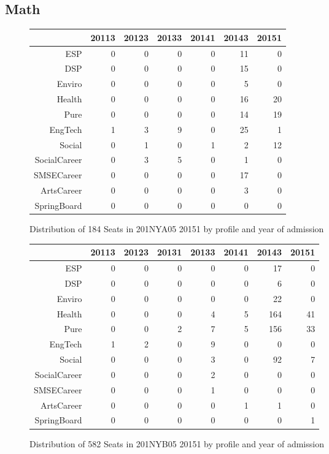 \documentclass{article}\usepackage[]{graphicx}\usepackage[]{color}
\begin{document}
\subsection{Math}
\begin{figure}[H]
\centering
\begin{tabular}{rrrrrrr}
  \hline
 & 20113 & 20123 & 20133 & 20141 & 20143 & 20151 \\ 
  \hline
ESP &   0 &   0 &   0 &   0 &  11 &   0 \\ 
  DSP &   0 &   0 &   0 &   0 &  15 &   0 \\ 
  Enviro &   0 &   0 &   0 &   0 &   5 &   0 \\ 
  Health &   0 &   0 &   0 &   0 &  16 &  20 \\ 
  Pure &   0 &   0 &   0 &   0 &  14 &  19 \\ 
  EngTech &   1 &   3 &   9 &   0 &  25 &   1 \\ 
  Social &   0 &   1 &   0 &   1 &   2 &  12 \\ 
  SocialCareer &   0 &   3 &   5 &   0 &   1 &   0 \\ 
  SMSECareer &   0 &   0 &   0 &   0 &  17 &   0 \\ 
  ArtsCareer &   0 &   0 &   0 &   0 &   3 &   0 \\ 
  SpringBoard &   0 &   0 &   0 &   0 &   0 &   0 \\ 
   \hline
\end{tabular}
\caption{Distribution of 184 Seats in 201NYA05 20151 by profile and year of admission} 
\end{figure}
\begin{figure}[H]
\centering
\begin{tabular}{rrrrrrrr}
  \hline
 & 20113 & 20123 & 20131 & 20133 & 20141 & 20143 & 20151 \\ 
  \hline
ESP &   0 &   0 &   0 &   0 &   0 &  17 &   0 \\ 
  DSP &   0 &   0 &   0 &   0 &   0 &   6 &   0 \\ 
  Enviro &   0 &   0 &   0 &   0 &   0 &  22 &   0 \\ 
  Health &   0 &   0 &   0 &   4 &   5 & 164 &  41 \\ 
  Pure &   0 &   0 &   2 &   7 &   5 & 156 &  33 \\ 
  EngTech &   1 &   2 &   0 &   9 &   0 &   0 &   0 \\ 
  Social &   0 &   0 &   0 &   3 &   0 &  92 &   7 \\ 
  SocialCareer &   0 &   0 &   0 &   2 &   0 &   0 &   0 \\ 
  SMSECareer &   0 &   0 &   0 &   1 &   0 &   0 &   0 \\ 
  ArtsCareer &   0 &   0 &   0 &   0 &   1 &   1 &   0 \\ 
  SpringBoard &   0 &   0 &   0 &   0 &   0 &   0 &   1 \\ 
   \hline
\end{tabular}
\caption{Distribution of 582 Seats in 201NYB05 20151 by profile and year of admission} 
\end{figure}
\end{document}

